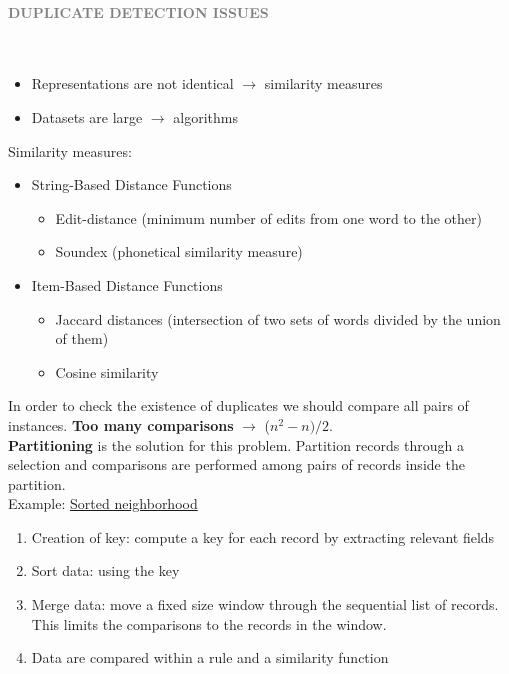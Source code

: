 \documentclass[10pt,a4paper]{article}
\newcommand{\myparagraph}[1]{\paragraph{\normalsize{\textcolor{gray}{\uppercase{\textbf{#1}}}} }\mbox{} \vspace{0.5em}\\}
\begin{document}
\pagebreak
\myparagraph{Duplicate Detection Issues}
\begin{itemize}
	\item Representations are not identical $\rightarrow$ similarity measures
	\item Datasets are large $\rightarrow$ algorithms
\end{itemize}
Similarity measures:
\begin{itemize}
	\item String-Based Distance Functions
	\begin{itemize}
		\item Edit-distance (minimum number of edits from one word to the other)
		\item Soundex (phonetical similarity measure)
	\end{itemize}
	\item Item-Based Distance Functions
	\begin{itemize}
		\item Jaccard distances (intersection of two sets of words divided by the union of them)
		\item Cosine similarity
	\end{itemize}
\end{itemize}
In order to check the existence of duplicates we should compare all pairs of instances. \textbf{Too many comparisons} $\rightarrow$ ($n^2-n)/2$. \\
\textbf{Partitioning} is the solution for this problem. Partition records through a selection and comparisons are performed among pairs of records inside the partition. \\ 
Example: \uline{Sorted neighborhood}
\begin{enumerate}
	\item Creation of key: compute a key for each record by extracting relevant fields
	\item Sort data: using the key 
	\item Merge data: move a fixed size window through the sequential list of records. This limits the comparisons to the records in the window. 
	\item Data are compared within a rule and a similarity function
\end{enumerate}
\end{document}
